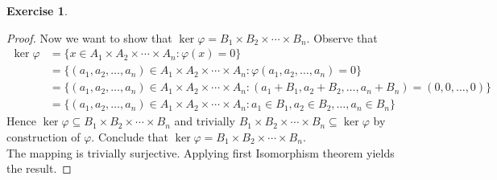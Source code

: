 \documentclass[8pt]{amsart}
\theoremstyle{plain}%
\theoremstyle{definition}
\newtheorem{exercise}{Exercise}[section]
\theoremstyle{remark}
\numberwithin{equation}{section}
\begin{document}
\begin{exercise}
\begin{proof}
		Now we want to show that $\ker \varphi = B_1 \times B_2 \times \cdots \times B_n$. Observe that
		\begin{align*}
			\ker \varphi &= \{x \in A_1 \times A_2 \times \cdots \times A_n : \varphi(x)= 0\}\\
			&= \{(a_1, a_2, \ldots, a_n) \in A_1 \times A_2 \times \cdots \times A_n : \varphi(a_1, a_2, \ldots, a_n) = 0\}\\
			&= \{(a_1, a_2, \ldots, a_n) \in A_1 \times A_2 \times \cdots \times A_n : (a_1 + B_1, a_2 + B_2, \ldots, a_n + B_n) = (0, 0, \ldots, 0)\}\\
			&= \{(a_1, a_2, \ldots, a_n) \in A_1 \times A_2 \times \cdots \times A_n : a_1 \in B_1, a_2 \in B_2, \ldots, a_n \in B_n\}
		\end{align*}
		Hence $\ker\varphi \subseteq B_1 \times B_2 \times \cdots \times B_n$ and trivially $B_1 \times B_2 \times \cdots \times B_n \subseteq \ker \varphi$ by construction of $\varphi$. Conclude that $\ker \varphi = B_1 \times B_2 \times \cdots \times B_n$.\\

		The mapping is trivially surjective. Applying first Isomorphism theorem yields the result.
	\end{proof}
\end{exercise}
\end{document}
